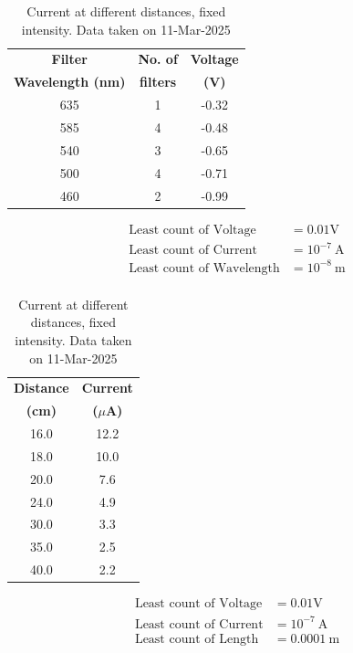 \documentclass[%
 sor,
 jor,
 amsmath,amssymb,
 reprint,%
]{revtex4-2}
\begin{document}
\begin{table}[ht]
\centering
    \begin{minipage}[b]{0.48\hsize}\centering
\begin{tabular}{|c|c|c|}
\hline
\textbf{Filter}& \textbf{No. of } & \textbf{Voltage} \\
\textbf{Wavelength (nm)} & \textbf{filters}& \textbf{(V)}		\\
\hline
635 & 1 &	-0.32		\\
585 & 4 &	 -0.48        \\  
540 & 3 &	  -0.65       \\
500 & 4 &	   -0.71      \\
460 & 2 &	    -0.99     \\

\hline
\end{tabular}
\caption{Stopping voltage at different filters, with source at $l=25.0 ~\si{\centi\meter}$. Data taken on 11-Mar-2025}
\label{tab:table1}
\[
\boxed{
\begin{aligned}
         \text{Least count of Voltage}  &= 0.01\si{\volt} \\
	 \text{Least count of Current}  &= 10^{-7}~\si{\ampere} \\
	 \text{Least count of Wavelength}  &= 10^{-8}~\si{\meter} \\
\end{aligned}
}
\]


\end{minipage}
\hfill\vline\hfill
    \begin{minipage}[b]{0.48\hsize}\centering
\begin{tabular}{|c|c|}
\hline
\textbf{Distance } & \textbf{Current} \\
\textbf{(cm)} & \textbf{($\mu$A)} \\
\hline
16.0 	 &12.2 		\\
18.0 	 &10.0          \\  
20.0 	 & 7.6          \\
24.0 	 & 4.9          \\
30.0 	 & 3.3          \\
35.0 	 & 2.5  	\\
40.0 	 & 2.2  	\\
\hline
\end{tabular}
\caption{Current at different distances, fixed intensity. Data taken on 11-Mar-2025 }
\label{tab:table2}
\[ \boxed{
 \begin{aligned}
         \text{Least count of Voltage}  &= 0.01\si{\volt} \\
	 \text{Least count of Current}  &= 10^{-7}~\si{\ampere} \\
         \text{Least count of Length}  &= 0.0001~\si{\meter} \\
 \end{aligned}
}
\]

   \end{minipage}
\end{table}
\end{document}
